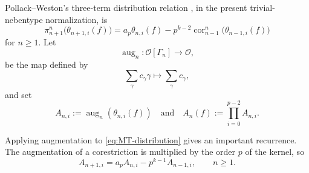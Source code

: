 \documentclass[11pt,table]{amsart}
\numberwithin{equation}{section}
\begin{document}
\par Pollack--Weston's three-term distribution relation
\cite[Proposition~2.5]{PollackWeston}, in the present
trivial-nebentype normalization, is
\begin{equation}
\label{eq:MT-distribution}
        \pi_{n+1}^{n}
        \bigl(\theta_{n+1,i}(f)\bigr)
        =
        a_p\theta_{n,i}(f)
        -
        p^{k-2}
        \operatorname{cor}_{n-1}^{n}
        \bigl(\theta_{n-1,i}(f)\bigr)
\end{equation}
for $n\geq 1$. Let
\[
        \operatorname{aug}_n:
        \mathcal O[\Gamma_n]\longrightarrow\mathcal O,
\]
be the map defined by \[\sum_{\gamma}c_\gamma\gamma
        \longmapsto
        \sum_{\gamma}c_\gamma,\]
and set
\begin{equation}
\label{eq:def-Ani}
        A_{n,i}
        :=
        \operatorname{aug}_n(\theta_{n,i}(f))
        \quad\text{and}\quad
        A_n(f)
        :=
        \prod_{i=0}^{p-2}A_{n,i}.
\end{equation}

\par Applying augmentation to
\eqref{eq:MT-distribution} gives an important recurrence.  The
augmentation of a corestriction is multiplied by the order \(p\) of
the kernel, so
\begin{equation}
\label{eq:augmentation-recursion}
        A_{n+1,i}
        =
        a_pA_{n,i}
        -
        p^{k-1}A_{n-1,i},
        \qquad n\geq1.
\end{equation}
\end{document}
